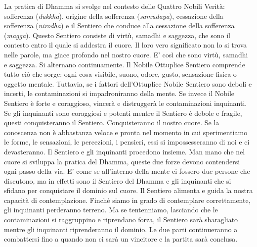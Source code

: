 La pratica di Dhamma si svolge nel contesto delle Quattro Nobili Verità:
sofferenza (\emph{dukkha}), origine della sofferenza (\emph{samudaya}),
cessazione della sofferenza (\emph{nirodha}) e il Sentiero che conduce
alla cessazione della sofferenza (\emph{magga}). Questo Sentiero
consiste di virtù, samadhi e saggezza, che sono il contesto entro il
quale si addestra il cuore. Il loro vero significato non lo si trova
nelle parole, ma giace profondo nel nostro cuore. E' così che sono
virtù, samadhi e saggezza. Si alternano continuamente. Il Nobile
Ottuplice Sentiero comprende tutto ciò che sorge: ogni cosa visibile,
suono, odore, gusto, sensazione fisica o oggetto mentale. Tuttavia, se i
fattori dell'Ottuplice Nobile Sentiero sono deboli e incerti, le
contaminazioni si impadroniranno della mente. Se invece il Nobile
Sentiero è forte e coraggioso, vincerà e distruggerà le contaminazioni
inquinanti. Se gli inquinanti sono coraggiosi e potenti mentre il
Sentiero è debole e fragile, questi conquisteranno il Sentiero.
Conquisteranno il nostro cuore. Se la conoscenza non è abbastanza veloce
e pronta nel momento in cui sperimentiamo le forme, le sensazioni, le
percezioni, i pensieri, essi si impossesseranno di noi e ci
devasteranno. Il Sentiero e gli inquinanti procedono insieme. Man mano
che nel cuore si sviluppa la pratica del Dhamma, queste due forze devono
contendersi ogni passo della via. E' come se all'interno della mente ci
fossero due persone che discutono, ma in effetti sono il Sentiero del
Dhamma e gli inquinanti che si sfidano per conquistare il dominio sul
cuore. Il Sentiero alimenta e guida la nostra capacità di
contemplazione. Finché siamo in grado di contemplare correttamente, gli
inquinanti perderanno terreno. Ma se tentenniamo, lasciando che le
contaminazioni si raggruppino e riprendano forza, il Sentiero sarà
sbaragliato mentre gli inquinanti riprenderanno il dominio. Le due parti
continueranno a combattersi fino a quando non ci sarà un vincitore e la
partita sarà conclusa.


